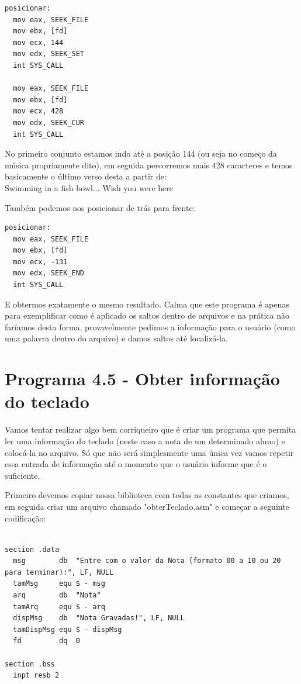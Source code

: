 \begin{lstlisting}[]
posicionar:
  mov eax, SEEK_FILE
  mov ebx, [fd]
  mov ecx, 144
  mov edx, SEEK_SET
  int SYS_CALL

  mov eax, SEEK_FILE
  mov ebx, [fd]
  mov ecx, 428
  mov edx, SEEK_CUR
  int SYS_CALL
\end{lstlisting}

No primeiro conjunto estamos indo até a posição 144 (ou seja no começo da música propriamente dito), em seguida percorremos mais 428 caracteres e temos basicamente o último verso desta a partir de: \\
{\ttfamily Swimming in a fish bowl... Wish you were here}

Também podemos nos posicionar de trás para frente:
\begin{lstlisting}[]
posicionar:
  mov eax, SEEK_FILE
  mov ebx, [fd]
  mov ecx, -131
  mov edx, SEEK_END
  int SYS_CALL
\end{lstlisting}

E obtermos exatamente o mesmo resultado. Calma que este programa é apenas para exemplificar como é aplicado os saltos dentro de arquivos e na prática não faríamos desta forma, provavelmente pedimos a informação para o usuário (como uma palavra dentro do arquivo) e damos saltos até localizá-la.

\section{Programa 4.5 - Obter informação do teclado}
Vamos tentar realizar algo bem corriqueiro que é criar um programa que permita ler uma informação do teclado (neste caso a nota de um determinado aluno) e colocá-la no arquivo. Só que não será simplesmente uma única vez vamos repetir essa entrada de informação até o momento que o usuário informe que é o suficiente.

Primeiro devemos copiar nossa biblioteca com todas as constantes que criamos, em seguida criar um arquivo chamado "obterTeclado.asm" e começar a seguinte codificação:
\begin{lstlisting}[]
%include 'bibliotecaE.inc'

section .data
  msg        db  "Entre com o valor da Nota (formato 00 a 10 ou 20 para terminar):", LF, NULL
  tamMsg     equ $ - msg
  arq        db  "Nota"
  tamArq     equ $ - arq
  dispMsg    db  "Nota Gravadas!", LF, NULL
  tamDispMsg equ $ - dispMsg 
  fd         dq  0

section .bss
  inpt resb 2	
\end{lstlisting}

